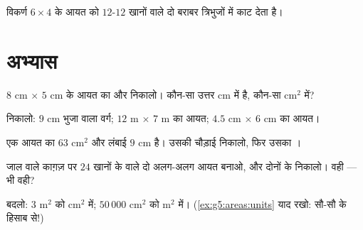 \begin{omfigure}

{\small विकर्ण $6 \times 4$ के आयत को $12$-$12$ खानों वाले दो
बराबर त्रिभुजों में काट देता है।}
\end{omfigure}

\section{अभ्यास}

\begin{exercise}[$\star$]\label{exo:g5:areas:1}
$8$ cm $\times$ $5$ cm के आयत का  और  निकालो।
कौन-सा उत्तर cm में है, कौन-सा cm$^2$ में?
\end{exercise}

\begin{exercise}[$\star$]\label{exo:g5:areas:2}
 निकालो: $9$ cm भुजा वाला वर्ग; $12$ m $\times$ $7$ m
का आयत; $4.5$ cm $\times$ $6$ cm का आयत।
\end{exercise}

\begin{exercise}[$\star$]\label{exo:g5:areas:3}
एक आयत का  $63$ cm$^2$ और लंबाई $9$ cm है। उसकी चौड़ाई
निकालो, फिर उसका ।
\end{exercise}

\begin{exercise}[$\star$]\label{exo:g5:areas:4}
जाल वाले काग़ज़ पर $24$ खानों के  वाले दो अलग-अलग आयत
बनाओ, और दोनों के  निकालो।  वही ---  भी वही?
\end{exercise}

\begin{exercise}[$\star$]\label{exo:g5:areas:5}
बदलो: $3$ m$^2$ को cm$^2$ में; \quad $50\,000$ cm$^2$ को m$^2$ में।
(\cref{ex:g5:areas:units} याद रखो: सौ-सौ के हिसाब से!)
\end{exercise}

